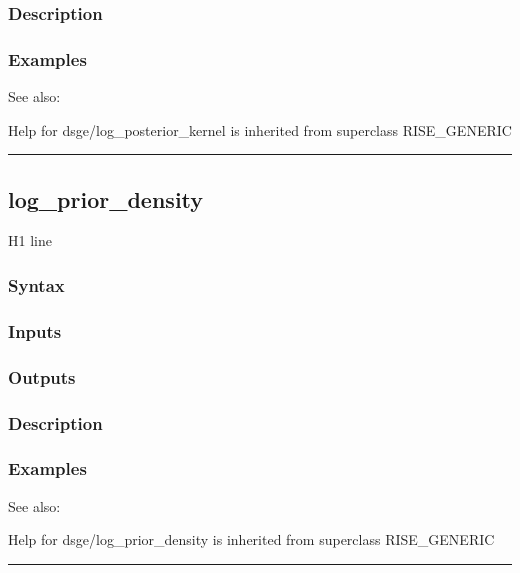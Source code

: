 \documentclass[letterpaper,10pt,english]{sphinxmanual}
\begin{document}
\subsubsection{Description}
\label{classes/models/@dsge/dsge:id96}

\subsubsection{Examples}
\label{classes/models/@dsge/dsge:id97}
See also:

Help for dsge/log\_posterior\_kernel is inherited from superclass RISE\_GENERIC


\bigskip\hrule{}\bigskip



\subsection{log\_prior\_density}
\label{classes/models/@dsge/dsge:id98}\label{classes/models/@dsge/dsge:log-prior-density}
H1 line


\subsubsection{Syntax}
\label{classes/models/@dsge/dsge:id99}

\subsubsection{Inputs}
\label{classes/models/@dsge/dsge:id100}

\subsubsection{Outputs}
\label{classes/models/@dsge/dsge:id101}

\subsubsection{Description}
\label{classes/models/@dsge/dsge:id102}

\subsubsection{Examples}
\label{classes/models/@dsge/dsge:id103}
See also:

Help for dsge/log\_prior\_density is inherited from superclass RISE\_GENERIC


\bigskip\hrule{}\bigskip
\end{document}
